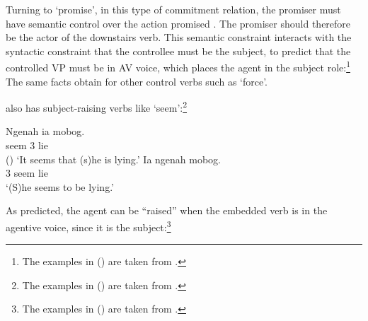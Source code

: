 Turning to  `promise', in this type of commitment relation, the promiser must have
semantic control over the action promised \citep{Farkas1988,Kroeger1993,SagandPollard1991}\addpages. The
promiser should therefore be the actor of the downstairs verb. This semantic constraint interacts
with the syntactic constraint that the controllee must be the subject, to predict that the
controlled VP must be in AV voice, which places the agent in the subject role:\footnote{%
  The examples in () are taken from .
}
\eal
{}
\zl
The same facts obtain for other control verbs such as  `force'.

 also has subject-raising verbs like  `seem':\footnote{
The examples in () are taken from .
}

\eal
\ex 
\gll Ngenah ia mobog.\\
     seem 3 lie\\\hfill()
\glt `It seems that (s)he is lying.'
\ex 
\gll  Ia ngenah mobog.\\
      3 seem lie\\
\glt `(S)he seems to be lying.'
\zl

As predicted, the agent can be ``raised'' when the embedded verb is in the agentive voice, since it is the subject:\footnote{
The examples in () are taken from .
}

\eal
{}
\zl

